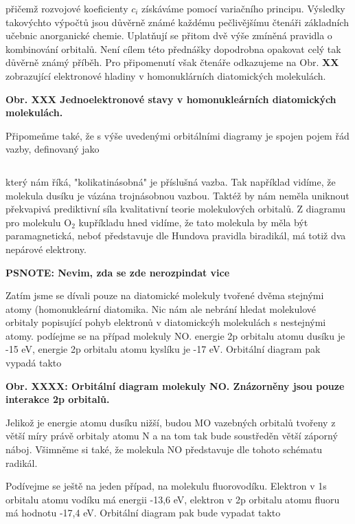 \noindent přičemž rozvojové koeficienty $c_i$ získáváme pomocí variačního principu. Výsledky takovýchto výpočtů jsou důvěrně známé každému pečlivějšímu čtenáři základních učebnic anorganické chemie. Uplatňují se přitom dvě výše zmíněná pravidla o kombinování orbitalů. Není cílem této přednášky dopodrobna opakovat celý tak důvěrně známý příběh. Pro připomenutí však čtenáře odkazujeme na Obr. \textbf{XX} zobrazující elektronové hladiny v homonuklárních diatomických molekulách.

\bigskip
\textbf{Obr. XXX Jednoelektronové stavy v homonukleárních diatomických molekulách.}
\bigskip

Připomeňme také, že s výše uvedenými orbitálními diagramy je spojen pojem řád vazby, definovaný jako

\begin{equation}
\label{rov:XXX}
\end{equation}

který nám říká, "kolikatinásobná" je příslušná vazba. Tak například vidíme, že molekula dusíku je vázána trojnásobnou vazbou. Taktéž by nám neměla uniknout překvapivá prediktivní síla kvalitativní teorie molekulových orbitalů. Z diagramu pro molekulu O$_2$ kupříkladu hned vidíme, že tato molekula by měla být paramagnetická, neboť představuje dle Hundova pravidla biradikál, má totiž dva nepárové elektrony.

\textbf{PSNOTE: Nevim, zda se zde nerozpindat vice}

Zatím jsme se dívali pouze na diatomické molekuly tvořené dvěma stejnými atomy (homonukleární diatomika. Nic nám ale nebrání hledat molekulové orbitaly popisující pohyb elektronů v diatomickcýh molekulách s nestejnými atomy. podíejme se na případ molekuly NO. energie 2p orbitalu atomu dusíku je -15 eV, energie 2p orbitalu atomu kyslíku je -17 eV. Orbitální diagram pak vypadá takto

\bigskip
\bigskip
\textbf{Obr. XXXX: Orbitální diagram molekuly NO. Znázorněny jsou pouze interakce 2p orbitalů.}
\bigskip
\bigskip

\noindent Jelikož je energie atomu dusíku nižší, budou MO vazebných orbitalů tvořeny z větší míry právě orbitaly atomu N a na tom tak bude soustředěn větší záporný náboj. Všimněme si také, že molekula NO představuje dle tohoto schématu radikál.


Podívejme se ještě na jeden případ, na molekulu fluorovodíku. Elektron v 1s orbitalu atomu vodíku má energii -13,6 eV, elektron v 2p orbitalu atomu fluoru má hodnotu -17,4 eV. Orbitální diagram pak bude vypadat takto


